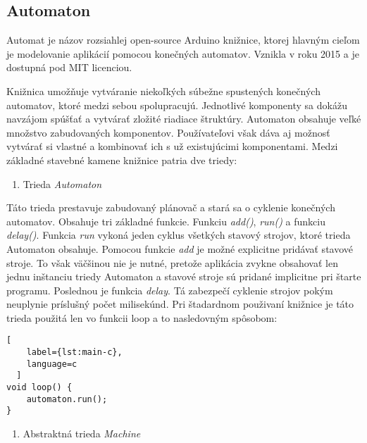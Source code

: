 \subsection{Automaton}
\noindent \par Automat je názov rozsiahlej open-source Arduino knižnice, ktorej hlavným cieľom
je modelovanie aplikácií pomocou konečných automatov. Vznikla v roku 2015 a je dostupná pod MIT licenciou.
\par Knižnica umožňuje vytváranie niekoľkých súbežne spustených konečných automatov, ktoré medzi sebou spolupracujú.
Jednotlivé komponenty sa dokážu navzájom spúšťať a vytvárať zložité riadiace štruktúry.
Automaton obsahuje veľké množstvo zabudovaných komponentov. Používateľovi však dáva aj možnosť vytvárať si vlastné a kombinovať ich s už existujúcimi komponentami.
Medzi základné stavebné kamene knižnice patria dve triedy:
\begin{enumerate}
  \item Trieda \textit{Automaton}
\end{enumerate}

\noindent \par Táto trieda prestavuje zabudovaný plánovač a stará sa o cyklenie konečných automatov. Obsahuje tri základné funkcie. Funkciu \textit{add()}, \textit{run()} a funkciu \textit{delay()}.
Funkcia \textit{run} vykoná jeden cyklus všetkých stavový strojov, ktoré trieda Automaton obsahuje.
Pomocou funkcie \textit{add} je možné explicitne pridávať stavové stroje.
To však väčšinou nie je nutné, pretože aplikácia zvykne obsahovať len jednu inštanciu triedy Automaton a stavové stroje sú pridané implicitne pri štarte programu.
Poslednou je funkcia \textit{delay}. Tá zabezpečí cyklenie strojov pokým neuplynie príslušný počet milisekúnd.
Pri štadardnom použivaní knižnice je táto trieda použitá len vo funkcii loop a to nasledovným spôsobom:

\begin{lstlisting}[
    label={lst:main-c},
    language=c
  ]
void loop() {
    automaton.run();
}

\end{lstlisting}

\begin{enumerate}[resume]
  \item Abstraktná trieda \textit{Machine}
\end{enumerate}

